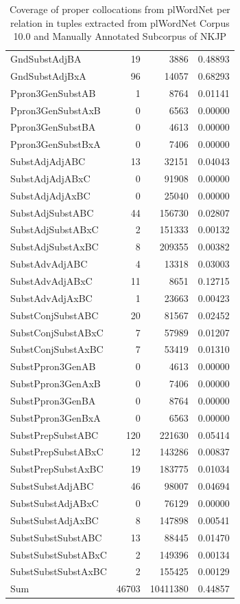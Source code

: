 \begin{table}[t]
\begin{tabular}{|l|r|r| r|}
        GndSubstAdjBA & 19 & 3886 & 0.48893 \\
        GndSubstAdjBxA & 96 & 14057 & 0.68293 \\
        Ppron3GenSubstAB & 1 & 8764 & 0.01141 \\
        Ppron3GenSubstAxB & 0 & 6563 & 0.00000 \\
        Ppron3GenSubstBA & 0 & 4613 & 0.00000 \\
        Ppron3GenSubstBxA & 0 & 7406 & 0.00000 \\
        SubstAdjAdjABC & 13 & 32151 & 0.04043 \\
        SubstAdjAdjABxC & 0 & 91908 & 0.00000 \\
        SubstAdjAdjAxBC & 0 & 25040 & 0.00000 \\
        SubstAdjSubstABC & 44 & 156730 & 0.02807 \\
        SubstAdjSubstABxC & 2 & 151333 & 0.00132 \\
        SubstAdjSubstAxBC & 8 & 209355 & 0.00382 \\
        SubstAdvAdjABC & 4 & 13318 & 0.03003 \\
        SubstAdvAdjABxC & 11 & 8651 & 0.12715 \\
        SubstAdvAdjAxBC & 1 & 23663 & 0.00423 \\
        SubstConjSubstABC & 20 & 81567 & 0.02452 \\
        SubstConjSubstABxC & 7 & 57989 & 0.01207 \\
        SubstConjSubstAxBC & 7 & 53419 & 0.01310 \\
        SubstPpron3GenAB & 0 & 4613 & 0.00000 \\
        SubstPpron3GenAxB & 0 & 7406 & 0.00000 \\
        SubstPpron3GenBA & 0 & 8764 & 0.00000 \\
        SubstPpron3GenBxA & 0 & 6563 & 0.00000 \\
        SubstPrepSubstABC & 120 & 221630 & 0.05414 \\
        SubstPrepSubstABxC & 12 & 143286 & 0.00837 \\
        SubstPrepSubstAxBC & 19 & 183775 & 0.01034 \\
        SubstSubstAdjABC & 46 & 98007 & 0.04694 \\
        SubstSubstAdjABxC & 0 & 76129 & 0.00000 \\
        SubstSubstAdjAxBC & 8 & 147898 & 0.00541 \\
        SubstSubstSubstABC & 13 & 88445 & 0.01470 \\
        SubstSubstSubstABxC & 2 & 149396 & 0.00134 \\
        SubstSubstSubstAxBC & 2 & 155425 & 0.00129 \\
        \hline
        Sum & 46703 & 10411380 & 0.44857 \\
        \hline
    \end{tabular} 
    \caption{Coverage of proper collocations from plWordNet per relation in tuples extracted from plWordNet Corpus 10.0 and Manually Annotated Subcorpus of NKJP}
    \label{cover_rel_stats}
\end{table}

